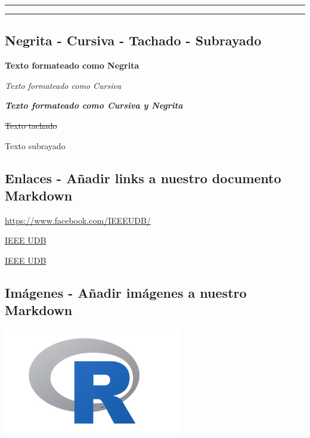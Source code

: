 \documentclass[
]{article}
\begin{document}
\begin{center}\rule{0.5\linewidth}{0.5pt}\end{center}

\begin{center}\rule{0.5\linewidth}{0.5pt}\end{center}

\hypertarget{negrita---cursiva---tachado---subrayado}{%
\subsection{Negrita - Cursiva - Tachado -
Subrayado}\label{negrita---cursiva---tachado---subrayado}}

\textbf{Texto formateado como Negrita}

\emph{Texto formateado como Cursiva}

\textbf{\emph{Texto formateado como Cursiva y Negrita}}

\sout{Texto tachado}

Texto subrayado

\hypertarget{enlaces---auxf1adir-links-a-nuestro-documento-markdown}{%
\subsection{Enlaces - Añadir links a nuestro documento
Markdown}\label{enlaces---auxf1adir-links-a-nuestro-documento-markdown}}

\url{https://www.facebook.com/IEEEUDB/}

\href{https://www.facebook.com/IEEEUDB/}{IEEE UDB}

\href{https://www.facebook.com/IEEEUDB/}{IEEE UDB}

\hypertarget{imuxe1genes---auxf1adir-imuxe1genes-a-nuestro-markdown}{%
\subsection{Imágenes - Añadir imágenes a nuestro
Markdown}\label{imuxe1genes---auxf1adir-imuxe1genes-a-nuestro-markdown}}

\includegraphics{logo_r.png}
\end{document}
